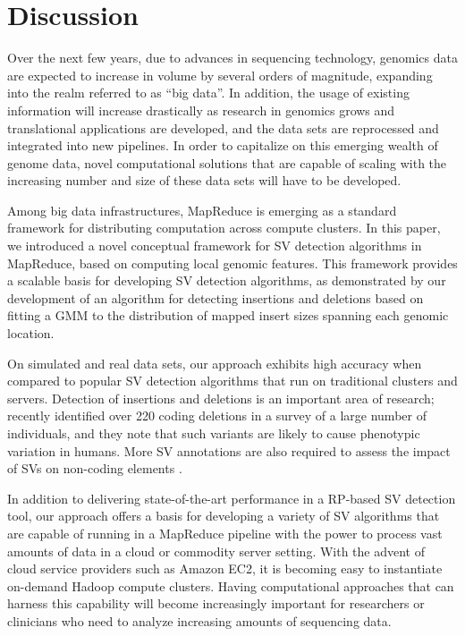 \documentclass[11pt]{article}
\begin{document}
\section{Discussion}\label{Discussion}

Over the next few years, due to advances in sequencing technology, genomics data are expected to increase in volume by several orders of magnitude, expanding into the realm referred to as ``big data''. In addition, the usage of existing information will increase drastically as research in genomics grows and translational applications are developed, and the data sets are reprocessed and integrated into new pipelines. In order to capitalize on this emerging wealth of genome data, novel computational solutions that are capable of scaling with the increasing number and size of these data sets will have to be developed. 

Among big data infrastructures, MapReduce is emerging as a standard framework for distributing computation across compute clusters. In this paper, we introduced a novel conceptual framework for SV detection algorithms in MapReduce, based on computing local genomic features. This framework provides a scalable basis for developing SV detection algorithms, as demonstrated by our development of an algorithm for detecting insertions and deletions based on fitting a GMM to the distribution of mapped insert sizes spanning each genomic location.

On simulated and real data sets, our approach exhibits high accuracy when compared to popular SV detection algorithms that run on traditional clusters and servers. Detection of insertions and deletions is an important area of research; \textcite{Mills:2011fi} recently identified over 220 coding deletions in a survey of a large number of individuals, and they note that such variants are likely to cause phenotypic variation in humans. More SV annotations are also required to assess the impact of SVs on non-coding elements \autocite{Mu:2011br}.

In addition to delivering state-of-the-art performance in a RP-based SV detection tool, our approach offers a basis for developing a variety of SV algorithms that are capable of running in a MapReduce pipeline with the power to process vast amounts of data in a cloud or commodity server setting. With the advent of cloud service providers such as Amazon EC2, it is becoming easy to instantiate on-demand Hadoop compute clusters. Having computational approaches that can harness this capability will become increasingly important for researchers or clinicians who need to analyze increasing amounts of sequencing data.
\end{document}
